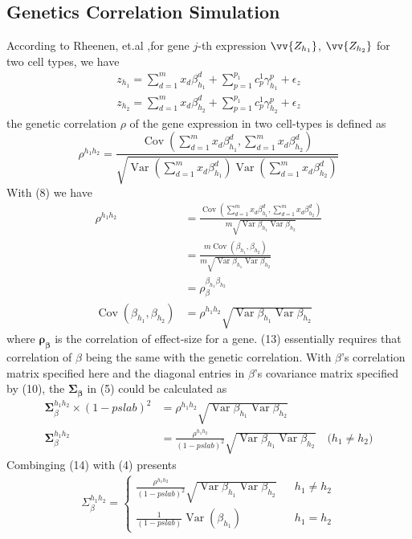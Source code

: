\documentclass{article}
\newcommand{\matr}[1]{\mathbf{#1}}
\DeclareMathOperator{\Var}{Var}
\DeclareMathOperator{\Cov}{Cov}
\begin{document}
\subsection{Genetics Correlation Simulation}
According to Rheenen, et.al \cite{vanRheenen2019},for gene $j$-th expression $\vv{Z_{h_1}}$, $\vv{Z_{h_2}}$ for two cell types, we have 
\begin{gather*}
    z_{h_1}=\sum_{d=1}^{m}x_d\beta^d_{h_1}+\sum_{p=1}^{p_1}c^1_p\gamma^p_{h_1} +\epsilon_z\\
    z_{h_2}=\sum_{d=1}^{m}x_d\beta^d_{h_2}+\sum_{p=1}^{p_1}c^1_p\gamma^p_{h_2} +\epsilon_z
\end{gather*}
the genetic correlation $\rho$ of the gene expression in two cell-types is defined as\\ 
\begin{equation}
    \rho^{h_1h_2} = \frac{\Cov{(\sum_{d=1}^{m}x_d\beta^d_{h_1},\sum_{d=1}^{m}x_d\beta^d_{h_2})}}{\sqrt{\Var{(\sum_{d=1}^{m}x_d\beta^d_{h_1})}\Var{(\sum_{d=1}^{m}x_d\beta^d_{h_2})}}} 
\end{equation}
With (8) we have
\begin{align}
    \rho^{h_1h_2} &= \frac{\Cov{(\sum_{d=1}^{m}x_d\beta^d_{h_1},\sum_{d=1}^{m}x_d\beta^d_{h_2})}}{m\sqrt{\Var{\beta_{h_1}}\Var{\beta_{h_2}}}}\nonumber\\
    &= \frac{m\Cov{(\beta_{h_1},\beta_{h_2})}}{m\sqrt{\Var{\beta_{h_1}}\Var{\beta_{h_2}}}} \nonumber\\
    &= \rho_{\beta}^{\beta_{h_1}\beta_{h_2}}\nonumber\\
    \Cov{(\beta_{h_1},\beta_{h_2})} &= \rho^{h_1h_2}\sqrt{\Var{\beta_{h_1}}\Var{\beta_{h_2}}}
\end{align}
where $\matr{\rho_{\beta}}$ is the correlation of effect-size for a gene. (13) essentially requires that correlation of $\beta$ being the same with the genetic correlation. With $\beta$'s correlation matrix specified here and the diagonal entries in $\beta$'s covariance matrix specified by (10), the $\matr{\Sigma_{\beta}}$ in (5) could be calculated as
\begin{align}
    \matr{\Sigma}^{h_1h_2}_{\beta} \times (1-pslab)^2 &= \rho^{h_1h_2}\sqrt{\Var{\beta_{h_1}}\Var{\beta_{h_2}}}\nonumber\\
    \matr{\Sigma}^{h_1h_2}_{\beta} &= \frac{\rho^{h_1h_2}}{(1-pslab)^2}\sqrt{\Var{\beta_{h_1}}\Var{\beta_{h_2}}}\quad \text{($h_1\neq h_2$)}
\end{align}
Combinging (14) with (4) presents\\
\begin{gather}
    \Sigma^{h_1h_2}_{\beta} = 
    \left\{
        \begin{array}{rcl}
        \frac{\rho^{h_1h_2}}{(1-pslab)^2}\sqrt{\Var{\beta_{h_1}}\Var{\beta_{h_2}}} & &{h_1\neq h_2}\\
        \frac{1}{(1-pslab)}\Var{(\beta_{h_1})} & &{h_1= h_2}
        \end{array}
    \right.
\end{gather}
\end{document}

